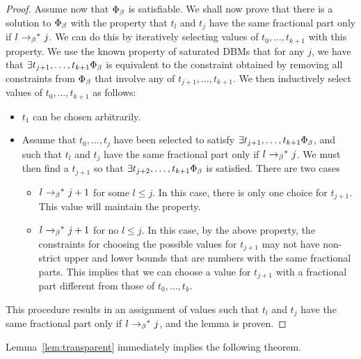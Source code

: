\begin{proof}
Assume now that $\Phi_{\beta}$ is satisfiable.
We shall now prove that
there is a solution to  $\Phi_{\beta}$ with the property that
$t_l$ and $t_j$ have the same fractional part only if
$l \ {\rightarrow_{\beta}}^*\  j$. We can do this by iteratively selecting
values of $t_0, \ldots , t_{k+1}$ with this property. We use the known
property of saturated DBMs that for any $j$, we have that
$\exists t_{j+1}, \ldots , t_{k+1}\Phi_{\beta}$ is equivalent to the
constraint obtained by removing all constraints from $\Phi_{\beta}$ that
involve any of $t_{j+1}, \ldots , t_{k+1}$.
We then inductively select values of $t_0, \ldots , t_{k+1}$ as follows:
\begin{itemize}
\item
  $t_1$ can be chosen arbitrarily.
\item Assume that  $t_0, \ldots , t_j$ have been selected to satisfy
  $\exists t_{j+1}, \ldots , t_{k+1}\Phi_{\beta}$, and such that
  $t_l$ and $t_j$ have the same fractional part only if
  $l \ {\rightarrow_{\beta}}^*\  j$.
  We must then find a $t_{j+1}$ so that
  $\exists t_{j+2}, \ldots , t_{k+1}\Phi_{\beta}$ is satisfied.
  There are two cases
  \begin{itemize}
  \item
    $l \ {\rightarrow_{\beta}}^*\  j+1$ for some $l \leq j$. In this case, there is only
    one choice for $t_{j+1}$. This value will maintain the property.
  \item
    $l \ {\rightarrow_{\beta}}^*\  j+1$ for no $l \leq j$. In this case, by the
    above property, the constraints for choosing the possible values for
    $t_{j+1}$ may not have non-strict upper and lower bounds that are numbers
    with the same fractional parts. This implies that we can choose a value
    for $t_{j+1}$ with a fractional part different from those of
     $t_0, \ldots , t_k$.
  \end{itemize}
\end{itemize}
This procedure results in an assignment of values such that
  $t_l$ and $t_j$ have the same fractional part only if
  $l \ {\rightarrow_{\beta}}^*\  j$, and the lemma is proven.
\end{proof}

Lemma~\ref{lem:transparent}  immediately implies the following
theorem.



